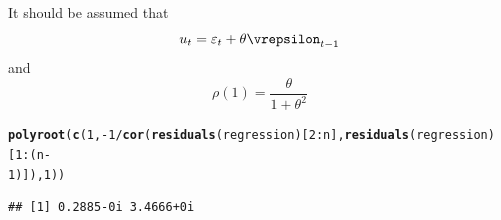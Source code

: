 \documentclass[12pt, a4paper, oneside]{article}\usepackage[]{graphicx}\usepackage[]{color}
\makeatletter
\newcommand{\hlkwd}[1]{\textcolor[rgb]{0.737,0.353,0.396}{\textbf{#1}}}%
\newenvironment{kframe}{%
 \def\at@end@of@kframe{}%
 \ifinner\ifhmode%
  \def\at@end@of@kframe{\end{minipage}}%
  \begin{minipage}{\columnwidth}%
 \fi\fi%
 \def\FrameCommand##1{\hskip\@totalleftmargin \hskip-\fboxsep
 \colorbox{shadecolor}{##1}\hskip-\fboxsep
     \hskip-\linewidth \hskip-\@totalleftmargin \hskip\columnwidth}%
 \MakeFramed {\advance\hsize-\width
   \@totalleftmargin\z@ \linewidth\hsize
   \@setminipage}}%
 {\par\unskip\endMakeFramed%
 \at@end@of@kframe}
\newenvironment{knitrout}{}{} %
\makeatother
\begin{document}
It should be assumed that 
\begin{equation}
u_t = \varepsilon_t + \theta \vrepsilon_{t-1}
\end{equation}
and 
\begin{equation}
\rho(1) = \frac{\theta}{1 + \theta^2}
\end{equation}
\begin{knitrout}
\color{fgcolor}\begin{kframe}
\begin{alltt}
\hlkwd{polyroot}(\hlkwd{c}(1, -1/\hlkwd{cor}(\hlkwd{residuals}(regression)[2:n], \hlkwd{residuals}(regression)[1:(n - 
    1)]), 1))
\end{alltt}
\begin{verbatim}
## [1] 0.2885-0i 3.4666+0i
\end{verbatim}
\end{kframe}
\end{knitrout}
\end{document}
